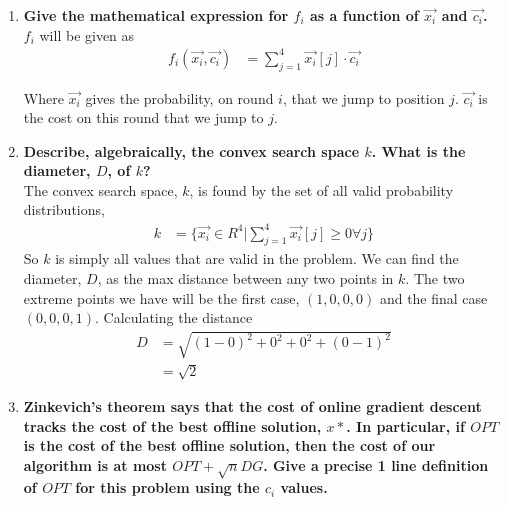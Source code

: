 \documentclass{article}
\begin{document}
\begin{enumerate}
\begin{enumerate}
\item \textbf{Give the mathematical expression for $f_i$ as a function of $\overrightarrow{x_i}$ and $\overrightarrow{c_i}$. } \\

$f_i$ will be given as 
\begin{align*}
    f_i(\overrightarrow{x_i}, \overrightarrow{c_i}) & = \sum_{j=1}^{4} \overrightarrow{x_i}[j] \cdot \overrightarrow{c_i}
\end{align*}

Where $\overrightarrow{x_i}$ gives the probability, on round $i$, that we jump to position $j$. $\overrightarrow{c_i}$ is the cost on this round that we jump to $j$. \\







\item \textbf{Describe, algebraically, the convex search space $k$. What is the diameter, $D$, of $k$?} \\

The convex search space, $k$, is found by the set of all valid probability distributions,
\begin{align*}
    k & = \{ \overrightarrow{x_i} \in R^4 | \sum_{j=1}^4 \overrightarrow{x_i}[j] \geq 0 \forall j \}
\end{align*}
So $k$ is simply all values that are valid in the problem. We can find the diameter, $D$, as the max distance between any two points in $k$. The two extreme points we have will be the first case, $(1,0,0,0)$ and the final case $(0,0,0,1)$. Calculating the distance 
\begin{align*}
    D & = \sqrt{(1-0)^2 + 0^2 + 0^2 + (0-1)^2} \\
    & = \sqrt{2}
\end{align*}






\newpage
\item \textbf{Zinkevich's theorem says that the cost of online gradient descent tracks the cost of the best offline solution, $x*$. In particular, if $OPT$ is the cost of the best offline solution, then the cost of our algorithm is at most $OPT + \sqrt{n}DG$. Give a precise 1 line definition of $OPT$ for this problem using the $c_i$ values. } \\


\end{enumerate}
\end{enumerate}
\end{document}
